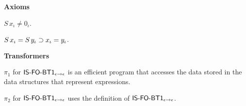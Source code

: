 \begin{biformthy}
  \ee

  \item[] \textbf{Axioms}

  \be

    \item $S \, x_\iota \not= 0_\iota$.

    \item $S \, x_\iota = S \, y_\iota \supset x_\iota =
      y_\iota$.

  \ee

  \item[] \textbf{Transformers}

  \be

    \item $\pi_1$ for $\mbox{\sf IS-FO-BT1}_{\epsilon \rightarrow \epsilon}$
      is an efficient program that accesses the data stored in the
      data structures that represent expressions.

    \item $\pi_2$ for $\mbox{\sf IS-FO-BT1}_{\epsilon \rightarrow \epsilon}$
      uses the definition of $\mbox{\sf IS-FO-BT1}_{\epsilon \rightarrow
        \epsilon}$.

  \ee

\ei
\end{biformthy}

